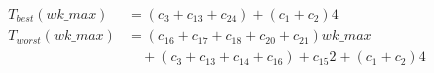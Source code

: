 \begin{subequations}
\label{eq:analyse-arlabeling-neighbour-case2-1}
\begin{align}
\label{eq:analyse-arlabeling-neighbour-case2-1-1}
T_{best}(\mathit{wk\_max})& = (c_{3} + c_{13} + c_{24}) + (c_{1} + c_{2})4 \\
\label{eq:analyse-arlabeling-neighbour-case2-1-2}
T_{worst}(\mathit{wk\_max})& = (c_{16} + c_{17} + c_{18} + c_{20} + c_{21})\mathit{wk\_max} \\
& \quad + (c_{3} + c_{13} + c_{14} + c_{16}) + c_{15}2 + (c_{1} + c_{2})4 \nonumber
\end{align}
\end{subequations}
